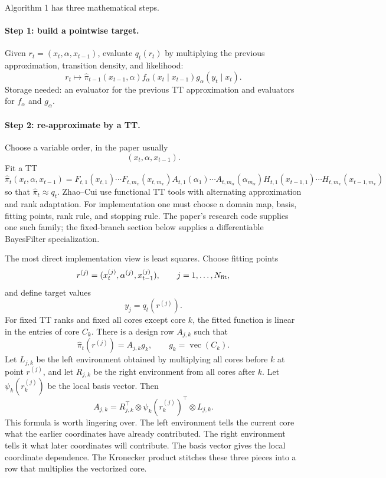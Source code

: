 \documentclass[11pt]{article}
\newcommand{\vecop}{\operatorname{vec}}
\begin{document}
Algorithm 1 has three mathematical steps.

\paragraph{Step 1: build a pointwise target.}
Given \(r_t=(x_t,\alpha,x_{t-1})\), evaluate \(q_t(r_t)\) by multiplying the
previous approximation, transition density, and likelihood:
\[
    r_t\mapsto
    \widehat\pi_{t-1}(x_{t-1},\alpha)
    f_\alpha(x_t\mid x_{t-1})
    g_\alpha(y_t\mid x_t).
\]
Storage needed: an evaluator for the previous TT approximation and evaluators
for \(f_\alpha\) and \(g_\alpha\).

\paragraph{Step 2: re-approximate by a TT.}
Choose a variable order, in the paper usually
\[
    (x_t,\alpha,x_{t-1}).
\]
Fit a TT
\[
    \widehat\pi_t(x_t,\alpha,x_{t-1})
    =
    F_{t,1}(x_{t,1})\cdots F_{t,m_x}(x_{t,m_x})
    A_{t,1}(\alpha_1)\cdots A_{t,m_\alpha}(\alpha_{m_\alpha})
    H_{t,1}(x_{t-1,1})\cdots H_{t,m_x}(x_{t-1,m_x})
    \tag{A1-2}
\]
so that \(\widehat\pi_t\approx q_t\).  Zhao--Cui use functional TT tools with
alternating approximation and rank adaptation.  For implementation one must
choose a domain map, basis, fitting points, rank rule, and stopping rule.  The
paper's research code supplies one such family; the fixed-branch section below
supplies a differentiable BayesFilter specialization.

The most direct implementation view is least squares.  Choose fitting points
\[
    r^{(j)}=(x_t^{(j)},\alpha^{(j)},x_{t-1}^{(j)}),
    \qquad j=1,\ldots,N_{\rm fit},
\]
and define target values
\[
    y_j=q_t(r^{(j)}).
\]
For fixed TT ranks and fixed all cores except core \(k\), the fitted function is
linear in the entries of core \(C_k\).  There is a design row \(A_{j,k}\) such
that
\[
    \widehat\pi_t(r^{(j)})=A_{j,k}g_k,
    \qquad g_k=\vecop(C_k).
    \tag{A1-2a}
\]
Let \(L_{j,k}\) be the left environment obtained by multiplying all cores before
\(k\) at point \(r^{(j)}\), and let \(R_{j,k}\) be the right environment from
all cores after \(k\).  Let
\(\psi_k(r_k^{(j)})\) be the local basis vector.  Then
\[
    A_{j,k}
    =
    R_{j,k}^{\top}\otimes \psi_k(r_k^{(j)})^\top\otimes L_{j,k}.
    \tag{A1-2b}
\]
This formula is worth lingering over.  The left environment tells the current
core what the earlier coordinates have already contributed.  The right
environment tells it what later coordinates will contribute.  The basis vector
gives the local coordinate dependence.  The Kronecker product stitches these
three pieces into a row that multiplies the vectorized core.
\end{document}
